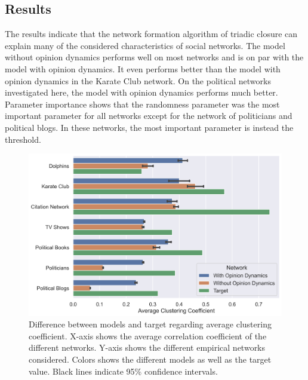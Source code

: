 \documentclass{article}
\begin{document}
\subsection{Results}

The results indicate that the network formation algorithm of triadic closure can explain many of the considered characteristics of social networks. The model without opinion dynamics performs well on most networks and is on par with the model with opinion dynamics. It even performs better than the model with opinion dynamics in the Karate Club network. On the political networks investigated here, the model with opinion dynamics performs much better.
Parameter importance shows that the randomness parameter was the most important parameter for all networks except for the network of politicians and political blogs.  In these networks, the most important parameter is instead the threshold. 

\begin{figure}[H]
    \centering
    \includegraphics[width=.8\linewidth]{../plots/overall/Model_Evaluation_Average_Clustering.png}
  \caption{Difference between models and target regarding average clustering coefficient. X-axis shows the average correlation coefficient of the different networks. Y-axis shows the different empirical networks considered. Colors shows the different models as well as the target value. Black lines indicate 95\% confidence intervals.}
  \label{fig:eval_clustering}
\end{figure}
\end{document}
